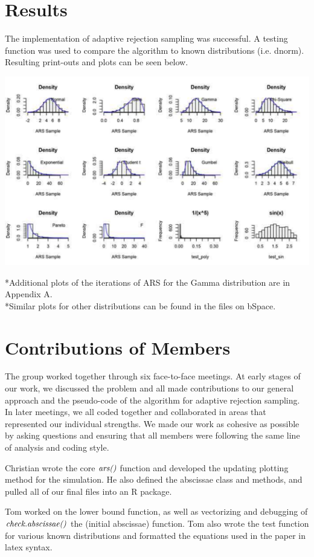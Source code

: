 \documentclass{article}\usepackage[]{graphicx}\usepackage[]{color}
\begin{document}
\section{Results}
The implementation of adaptive rejection sampling was successful.  A testing function was used to compare the algorithm to known distributions (i.e. dnorm).  Resulting print-outs and plots can be seen below.
\begin{center}
\includegraphics{12_Sampling_90per.pdf}
\end{center}
*Additional plots of the iterations of ARS for the Gamma distribution are in Appendix A.\\
*Similar plots for other distributions can be found in the files on bSpace.

\section{Contributions of Members}
The group worked together through six face-to-face meetings.  At early stages of our work, we discussed the problem and all made contributions to our general approach and the pseudo-code of the algorithm for adaptive rejection sampling.  In later meetings, we all coded together and collaborated in areas that represented our individual strengths.  We made our work as cohesive as possible by asking questions and ensuring that all members were following the same line of analysis and coding style.

Christian wrote the core $\emph{ars()}$ function and developed the updating plotting method for the simulation.  He also defined the abscissae class and methods, and pulled all of our final files into an R package.

Tom worked on the lower bound function, as well as vectorizing and debugging of $\emph{check.abscissae()}$ the (initial abscissae) function. Tom also wrote the test function for various known distributions and formatted the equations used in the paper in latex syntax.
\end{document}

